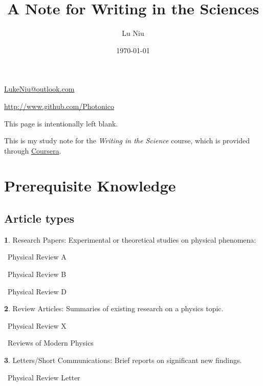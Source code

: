 \documentclass[a4paper, 12pt]{article}
\title{\textbf{A Note for Writing in the Sciences}}
\author{Lu Niu}
\date{\today}
\begin{document}
\maketitle
\vspace{\fill}
\begin{center}
    \par\href{mailto:LukeNiu@outlook.com}{LukeNiu@outlook.com}
    \par\href{http://www.github.com/Photonico}{http://www.github.com/Photonico}
\end{center}
\thispagestyle{empty}

\newpage
This page is intentionally left blank.
\thispagestyle{empty}

\newpage
\thispagestyle{empty}
\tableofcontents
\thispagestyle{empty}

\newpage
{}

This is my study note for the \textit{Writing in the Science} course,
which is provided through \href{https://www.coursera.org/learn/sciwrite}{Coursera}.

\section*{Prerequisite Knowledge}

\subsection{Article types}

\vspace{4pt}\textbf{1}. Research Papers: Experimental or theoretical studies on physical phenomena:
\par\quad\textopenbullet\ Physical Review A
\par\quad\textopenbullet\ Physical Review B
\par\quad\textopenbullet\ Physical Review D

\vspace{4pt}\textbf{2}. Review Articles: Summaries of existing research on a physics topic.
\par\quad\textopenbullet\ Physical Review X
\par\quad\textopenbullet\ Reviews of Modern Physics

\vspace{4pt}\textbf{3}. Letters/Short Communications: Brief reports on significant new findings.
\par\quad\textopenbullet\ Physical Review Letter
\end{document}
